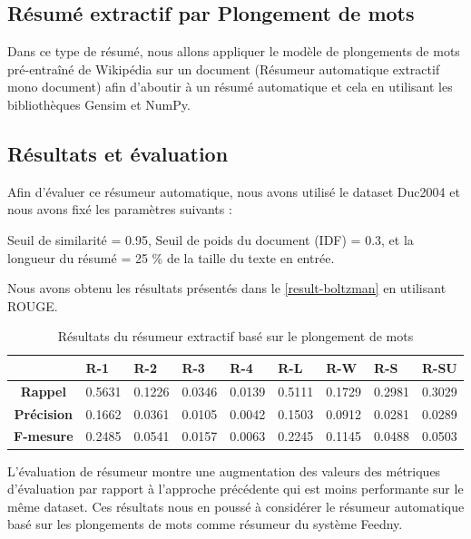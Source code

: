 \subsection{Résumé extractif par Plongement de mots}
Dans ce type de résumé, nous allons appliquer le modèle de plongements de mots pré-entraîné de Wikipédia \cite{fasttext} sur un document (Résumeur automatique extractif mono document) \cite{notreresume} afin d'aboutir à un résumé automatique et cela en utilisant les bibliothèques Gensim et NumPy. 

\subsection{Résultats et évaluation}
Afin d'évaluer ce résumeur automatique, nous avons utilisé le dataset Duc2004 et nous avons fixé les paramètres suivants :

Seuil de similarité = 0.95, Seuil de poids du document (IDF) = 0.3, et la longueur du résumé = 25 \% de la taille du texte en entrée.

Nous avons obtenu les résultats présentés dans le \autoref{result-boltzman} en utilisant ROUGE. 

\begin{table}[H]
    \begin{center}
        \begin{tabular}{|c|C{1.2cm}|C{1.2cm}|C{1.2cm}|C{1.2cm}|C{1.2cm}|C{1.2cm}|C{1.2cm}|C{1.2cm}|}
             & \textbf{R-1} &  \textbf{R-2} &  \textbf{R-3} &  \textbf{R-4} &  \textbf{R-L} &  \textbf{R-W} &  \textbf{R-S} &  \textbf{R-SU} \\
            \hline
            \textbf{Rappel} & 0.5631 & 0.1226 & 0.0346 & 0.0139 & 0.5111 & 0.1729 & 0.2981 & 0.3029 \\
            \textbf{Précision} & 0.1662 & 0.0361 & 0.0105 & 0.0042 & 0.1503 & 0.0912 & 0.0281 & 0.0289 \\
            \textbf{F-mesure} & 0.2485 & 0.0541 & 0.0157 & 0.0063 & 0.2245 & 0.1145 & 0.0488 & 0.0503 \\
            \hline
        \end{tabular}
    \end{center}
    \caption{Résultats du résumeur extractif basé sur le plongement de mots}
    \label{result-boltzman}
\end{table}

L'évaluation de résumeur montre une augmentation des valeurs des métriques d'évaluation par rapport à l'approche précédente qui est moins performante sur le même dataset. Ces résultats nous en poussé à considérer le résumeur automatique basé sur les plongements de mots comme résumeur du système \textquotedbl Feedny\textquotedbl.

